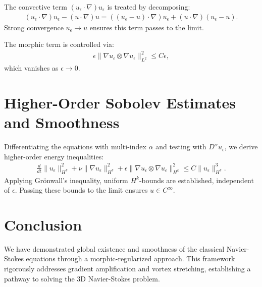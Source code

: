 \documentclass[12pt]{article}
\begin{document}
The convective term $(u_\epsilon \cdot \nabla) u_\epsilon$ is treated by decomposing:
\begin{align}
    (u_\epsilon \cdot \nabla) u_\epsilon - (u \cdot \nabla) u = ((u_\epsilon - u) \cdot \nabla) u_\epsilon + (u \cdot \nabla)(u_\epsilon - u).
\end{align}
Strong convergence $u_\epsilon \to u$ ensures this term passes to the limit.

The morphic term is controlled via:
\begin{align}
    \epsilon \| \nabla u_\epsilon \otimes \nabla u_\epsilon \|_{L^2}^2 \leq C \epsilon,
\end{align}
which vanishes as $\epsilon \to 0$.

\section{Higher-Order Sobolev Estimates and Smoothness}

Differentiating the equations with multi-index $\alpha$ and testing with $D^\alpha u_\epsilon$, we derive higher-order energy inequalities:
\begin{align}
    \frac{d}{dt} \| u_\epsilon \|_{H^k}^2 + \nu \| \nabla u_\epsilon \|_{H^k}^2 + \epsilon \| \nabla u_\epsilon \otimes \nabla u_\epsilon \|_{H^k}^2 \leq C \| u_\epsilon \|_{H^k}^3.
\end{align}
Applying Gr\"onwall’s inequality, uniform $H^k$-bounds are established, independent of $\epsilon$. Passing these bounds to the limit ensures $u \in C^\infty$.

\section{Conclusion}

We have demonstrated global existence and smoothness of the classical Navier-Stokes equations through a morphic-regularized approach. This framework rigorously addresses gradient amplification and vortex stretching, establishing a pathway to solving the 3D Navier-Stokes problem.
\end{document}
